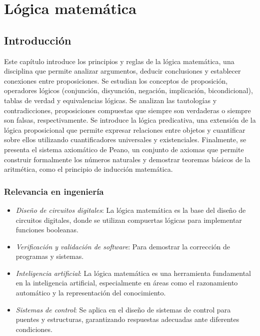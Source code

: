 \chapter{Lógica matemática}

\section{Introducción}

Este capítulo introduce los principios y reglas de la lógica matemática, una disciplina que permite analizar argumentos, deducir conclusiones y establecer conexiones entre proposiciones. Se estudian los conceptos de proposición, operadores lógicos (conjunción, disyunción, negación, implicación, bicondicional), tablas de verdad y equivalencias lógicas.
Se analizan las tautologías y contradicciones, proposiciones compuestas que siempre son verdaderas o siempre son falsas, respectivamente. Se introduce la lógica predicativa, una extensión de la lógica proposicional que permite expresar relaciones entre objetos y cuantificar sobre ellos utilizando cuantificadores universales y existenciales.
Finalmente, se presenta el sistema axiomático de Peano, un conjunto de axiomas que permite construir formalmente los números naturales y demostrar teoremas básicos de la aritmética, como el principio de inducción matemática.

\subsection{Relevancia en ingeniería}

\begin{itemize}
	\item \textit{Diseño de circuitos digitales}: La lógica matemática es la base del diseño de circuitos digitales, donde se utilizan compuertas lógicas para implementar funciones booleanas.
	\item \textit{Verificación y validación de software}: Para demostrar la corrección de programas y sistemas.
	\item \textit{Inteligencia artificial}: La lógica matemática es una herramienta fundamental en la inteligencia artificial, especialmente en áreas como el razonamiento automático y la representación del conocimiento.
	\item \textit{Sistemas de control}: Se aplica en el diseño de sistemas de control para puentes y estructuras, garantizando respuestas adecuadas ante diferentes condiciones.
\end{itemize}

